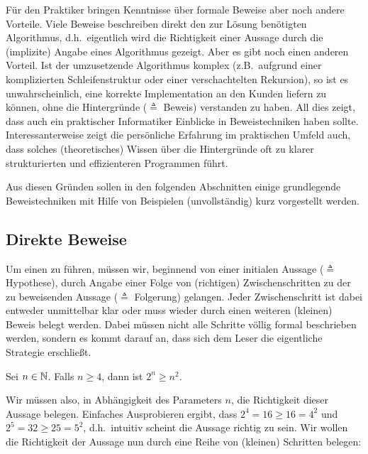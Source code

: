 Für den Praktiker bringen Kenntnisse über formale Beweise aber noch
andere Vorteile. Viele Beweise beschreiben direkt den zur Lösung
benötigten Algorithmus, d.h.~eigentlich wird die Richtigkeit einer
Aussage durch die (implizite) Angabe eines Algorithmus gezeigt. Aber
es gibt noch einen anderen Vorteil. Ist der umzusetzende Algorithmus
komplex (z.B.~aufgrund einer komplizierten Schleifenstruktur oder
einer verschachtelten Rekursion), so ist es unwahrscheinlich, eine
korrekte Implementation an den Kunden liefern zu können, ohne die
Hintergründe ($\triangleq$ Beweis) verstanden zu haben. All dies
zeigt, dass auch ein praktischer Informatiker Einblicke in
Beweistechniken haben sollte. Interessanterweise zeigt die persönliche Erfahrung im
praktischen Umfeld auch, dass solches (theoretisches) Wissen über die
Hintergründe oft zu klarer strukturierten und effizienteren Programmen
führt.

Aus diesen Gründen sollen in den folgenden Abschnitten einige
grundlegende Beweistechniken mit Hilfe von Beispielen (unvollständig)
kurz vorgestellt werden.

\subsection{Direkte Beweise}
Um einen  zu führen,
müssen wir, beginnend von einer initialen Aussage ($\triangleq$
Hypothese), durch Angabe einer Folge von (richtigen) Zwischenschritten
zu der zu beweisenden Aussage ($\triangleq$ Folgerung) gelangen. Jeder
Zwischenschritt ist dabei entweder unmittelbar klar oder muss wieder
durch einen weiteren (kleinen) Beweis belegt werden. Dabei müssen
nicht alle Schritte völlig formal beschrieben werden, sondern es kommt
darauf an, dass sich dem Leser die eigentliche Strategie erschließt.

\goodbreak
\begin{theorem}
\label{ExpoGTSquare}
Sei $n \in \mathbb N$. Falls $n \ge 4$, dann ist $2^n \ge n^2$.
\end{theorem}

Wir müssen also, in Abhängigkeit des Parameters $n$, die Richtigkeit
dieser Aussage belegen. Einfaches Ausprobieren ergibt, dass $2^4 = 16
\ge 16 = 4^2$ und $2^5 = 32 \ge 25 = 5^2$, d.h.~intuitiv scheint die
Aussage richtig zu sein. Wir wollen die Richtigkeit der Aussage nun
durch eine Reihe von (kleinen) Schritten belegen:

